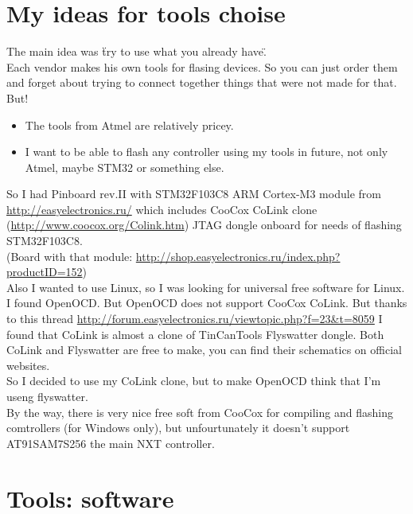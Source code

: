 \documentclass[11pt]{article}
\begin{document}
	\section{My ideas for tools choise}
		The main idea was \"try to use what you already have\".\\

		Each vendor makes his own tools for flasing devices. So you can just order them and forget about trying to connect together things that were not made for that. But!
		\begin{itemize}
			\item The tools from Atmel are relatively pricey.
			\item I want to be able to flash any controller using my tools in future, not only Atmel, maybe STM32 or something else.
		\end{itemize}
		So I had Pinboard rev.II with STM32F103C8 ARM Cortex-M3 module from
		\url{http://easyelectronics.ru/}\cite{easyelectronics}
		which includes CooCox CoLink clone
		(\url{http://www.coocox.org/Colink.htm}\cite{coocox_colink})
		JTAG dongle onboard for needs of flashing STM32F103C8.\\

		(Board with that module: \url{http://shop.easyelectronics.ru/index.php?productID=152}\cite{easyelectronics_shop_pinboard})\\

		Also I wanted to use Linux, so I was looking for universal free software for Linux. I found OpenOCD. But OpenOCD does not support CooCox CoLink. But thanks to this thread
		\url{http://forum.easyelectronics.ru/viewtopic.php?f=23&t=8059}\cite{easyelectronics_important_thread}
		 I found that CoLink is almost a clone of TinCanTools Flyswatter dongle. Both CoLink and Flyswatter are free to make, you can find their schematics on official websites.\\
		
		So I decided to use my CoLink clone, but to make OpenOCD think that I'm useng flyswatter.\\
		By the way, there is very nice free soft from CooCox for compiling and flashing comtrollers (for Windows only), but unfourtunately it doesn't support AT91SAM7S256 the main NXT controller.\\

	\section{Tools: software}
\end{document}
